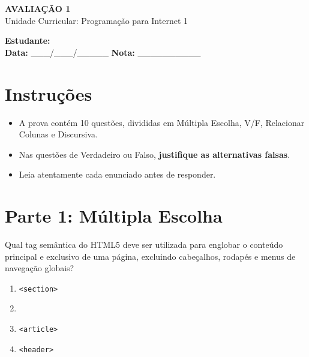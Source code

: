 \documentclass[12pt,a4paper]{article}
\newcommand{\correto}[1]{\iftoggle{gabarito}{\textbf{\color{corGabarito}#1}}{#1}}
\begin{document}
\begin{center}
    {\Large \textbf{AVALIAÇÃO 1}}\\
    \vspace{0.2cm}
    Unidade Curricular: Programação para Internet 1\\
    \iftoggle{gabarito}{\textbf{\color{corGabarito}CHAVE DE RESPOSTAS / GABARITO}}{}
\end{center}

\vspace{0.5cm}

\begin{tcolorbox}[colback=white, colframe=black, boxrule=0.5pt, arc=0pt]
    \textbf{Estudante:} \hrulefill \\
    \vspace{0.3cm}
    \textbf{Data:} \_\_\_/\_\_\_/\_\_\_\_\_ \hspace{2cm} \textbf{Nota:} \_\_\_\_\_\_\_\_\_\_
\end{tcolorbox}

\vspace{0.5cm}

\section*{Instruções}
\begin{itemize}
    \item A prova contém 10 questões, divididas em Múltipla Escolha, V/F, Relacionar Colunas e Discursiva.
    \item Nas questões de Verdadeiro ou Falso, \textbf{justifique as alternativas falsas}.
    \item Leia atentamente cada enunciado antes de responder.
\end{itemize}

\vspace{0.5cm}

\section*{Parte 1: Múltipla Escolha}

\begin{tcolorbox}[colback=white, colframe=azulTitulo, title=Questão 1: HTML5 Semântico]
    Qual tag semântica do HTML5 deve ser utilizada para englobar o conteúdo principal e exclusivo de uma página, excluindo cabeçalhos, rodapés e menus de navegação globais?
    \begin{enumerate}[label=\alph*)]
        \item \texttt{<section>}
        \item \correto{\texttt{<main>}}
        \item \texttt{<article>}
        \item \texttt{<header>}
    \end{enumerate}
\end{tcolorbox}
\end{document}
